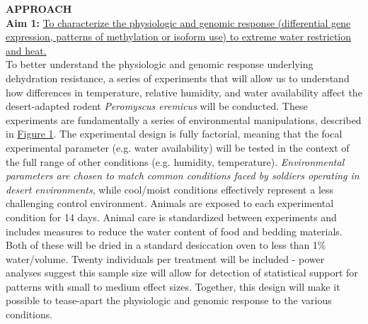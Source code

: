 \documentclass[12pt]{article}
\begin{document}
%
%
% 
%
%
%

\noindent \textbf{APPROACH} \\


\noindent \textbf{Aim 1:} \ul{To characterize the physiologic and genomic response (differential gene expression, patterns of methylation or isoform use) to extreme water restriction and heat.} \\

To better understand the physiologic and genomic response underlying dehydration resistance, a series of experiments that will allow us to understand how differences in temperature, relative humidity, and water availability affect the desert-adapted rodent \textit{Peromyscus eremicus} will be conducted. These experiments are fundamentally a series of environmental manipulations, described in \hyperlink{Figure 1}{Figure 1}. The experimental design is fully factorial, meaning that the focal experimental parameter (e.g. water availability) will be tested in the context of the full range of other conditions (e.g. humidity, temperature). \emph{Environmental parameters are chosen to match common conditions faced by soldiers operating in desert environments}, while cool/moist conditions effectively represent a less challenging control environment. Animals are exposed to each experimental condition for 14 days. Animal care is standardized between experiments and includes measures to reduce the water content of food and bedding materials. Both of these will be dried in a standard desiccation oven to less than 1\% water/volume. Twenty individuals per treatment will be included - power analyses suggest this sample size will allow for detection of statistical support for patterns with small to medium effect sizes. Together, this design will make it possible to tease-apart the physiologic and genomic response to the various conditions. \\
\end{document}
